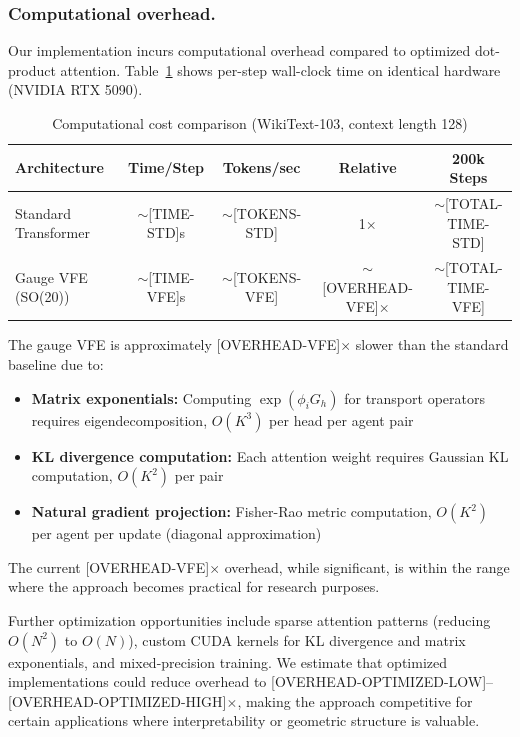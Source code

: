 \documentclass[twoside,11pt]{article}
\begin{document}
\subsubsection{Computational overhead.}

Our implementation incurs computational overhead compared to optimized dot-product attention. Table~\ref{tab:compute_cost} shows per-step wall-clock time on identical hardware (NVIDIA RTX 5090).

\begin{table}[h]
\centering
\caption{Computational cost comparison (WikiText-103, context length 128)}
\label{tab:compute_cost}
\begin{tabular}{lcccc}
\toprule
\textbf{Architecture} & \textbf{Time/Step} & \textbf{Tokens/sec} & \textbf{Relative} & \textbf{200k Steps} \\
\midrule
Standard Transformer & $\sim$[TIME-STD]s & $\sim$[TOKENS-STD] & 1$\times$ & $\sim$[TOTAL-TIME-STD] \\
Gauge VFE (SO(20)) & $\sim$[TIME-VFE]s & $\sim$[TOKENS-VFE] & $\sim$[OVERHEAD-VFE]$\times$ & $\sim$[TOTAL-TIME-VFE] \\
\bottomrule
\end{tabular}
\end{table}

The gauge VFE is approximately [OVERHEAD-VFE]$\times$ slower than the standard baseline due to:

\begin{itemize}
\item \textbf{Matrix exponentials:} Computing $\exp(\phi_i G_h)$ for transport operators requires eigendecomposition, $O(K^3)$ per head per agent pair

\item \textbf{KL divergence computation:} Each attention weight requires Gaussian KL computation, $O(K^2)$ per pair

\item \textbf{Natural gradient projection:} Fisher-Rao metric computation, $O(K^2)$ per agent per update (diagonal approximation)
\end{itemize}

The current [OVERHEAD-VFE]$\times$ overhead, while significant, is within the range where the approach becomes practical for research purposes.

Further optimization opportunities include sparse attention patterns (reducing $O(N^2)$ to $O(N)$), custom CUDA kernels for KL divergence and matrix exponentials, and mixed-precision training. We estimate that optimized implementations could reduce overhead to [OVERHEAD-OPTIMIZED-LOW]--[OVERHEAD-OPTIMIZED-HIGH]$\times$, making the approach competitive for certain applications where interpretability or geometric structure is valuable.  
\end{document}
